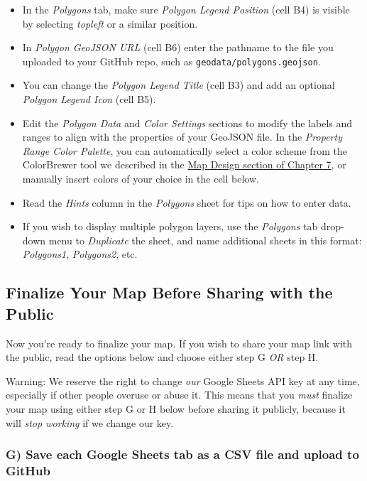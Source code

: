 \documentclass[
  english,
]{book}
\providecommand{\tightlist}{%
  \setlength{\itemsep}{0pt}\setlength{\parskip}{0pt}}
\begin{document}
\begin{itemize}
\tightlist
\item
  In the \emph{Polygons} tab, make sure \emph{Polygon Legend Position} (cell B4) is visible by selecting \emph{topleft} or a similar position.
\item
  In \emph{Polygon GeoJSON URL} (cell B6) enter the pathname to the file you uploaded to your GitHub repo, such as \texttt{geodata/polygons.geojson}.
\item
  You can change the \emph{Polygon Legend Title} (cell B3) and add an optional \emph{Polygon Legend Icon} (cell B5).
\item
  Edit the \emph{Polygon Data} and \emph{Color Settings} sections to modify the labels and ranges to align with the properties of your GeoJSON file. In the \emph{Property Range Color Palette}, you can automatically select a color scheme from the ColorBrewer tool we described in the \href{map-design.html}{Map Design section of Chapter 7}, or manually insert colors of your choice in the cell below.
\item
  Read the \emph{Hints} column in the \emph{Polygons} sheet for tips on how to enter data.
\item
  If you wish to display multiple polygon layers, use the \emph{Polygons} tab drop-down menu to \emph{Duplicate} the sheet, and name additional sheets in this format: \emph{Polygons1}, \emph{Polygons2}, etc.
\end{itemize}

\hypertarget{finalize-your-map-before-sharing-with-the-public}{%
\subsection*{Finalize Your Map Before Sharing with the Public}\label{finalize-your-map-before-sharing-with-the-public}}

Now you're ready to finalize your map. If you wish to share your map link with the public, read the options below and choose either step G \emph{OR} step H.

Warning: We reserve the right to change \emph{our} Google Sheets API key at any time, especially if other people overuse or abuse it. This means that you \emph{must} finalize your map using either step G or H below before sharing it publicly, because it will \emph{stop working} if we change our key.

\hypertarget{g-save-each-google-sheets-tab-as-a-csv-file-and-upload-to-github}{%
\subsubsection*{G) Save each Google Sheets tab as a CSV file and upload to GitHub}\label{g-save-each-google-sheets-tab-as-a-csv-file-and-upload-to-github}}
\end{document}

